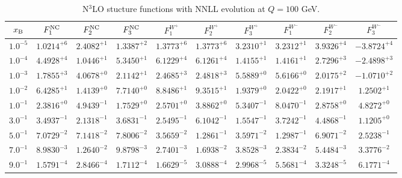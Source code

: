 \begin{table}[h]
\begin{adjustbox}{width=\textwidth}
\begin{tabular}{|c||c|c|c|c|c|c|c|c|c|}
\hline
$x_{\rm B}$ & $F_1^{\rm NC}$ & $F_2^{\rm NC}$ & $F_3^{\rm NC}$ & $F_1^{W^+}$ & $F_2^{W^+}$ & $F_3^{W^+}$ & $F_1^{W^-}$ & $F_2^{W^-}$ & $F_3^{W^-}$ \\
\hline
$ 1.0^{-5}$ & $ 1.0214^{+6}$ & $ 2.4082^{+1}$ & $ 1.3387^{+2}$ & $ 1.3773^{+6}$ & $ 1.3773^{+6}$ & $ 3.2310^{+1}$ & $ 3.2312^{+1}$ & $ 3.9326^{+4}$ & $-3.8724^{+4}$ \\
$ 1.0^{-4}$ & $ 4.4928^{+4}$ & $ 1.0446^{+1}$ & $ 5.3450^{+1}$ & $ 6.1229^{+4}$ & $ 6.1261^{+4}$ & $ 1.4155^{+1}$ & $ 1.4161^{+1}$ & $ 2.7296^{+3}$ & $-2.4898^{+3}$ \\
$ 1.0^{-3}$ & $ 1.7855^{+3}$ & $ 4.0678^{+0}$ & $ 2.1142^{+1}$ & $ 2.4685^{+3}$ & $ 2.4818^{+3}$ & $ 5.5889^{+0}$ & $ 5.6166^{+0}$ & $ 2.0175^{+2}$ & $-1.0710^{+2}$ \\
$ 1.0^{-2}$ & $ 6.4285^{+1}$ & $ 1.4139^{+0}$ & $ 7.7140^{+0}$ & $ 8.8486^{+1}$ & $ 9.3515^{+1}$ & $ 1.9379^{+0}$ & $ 2.0422^{+0}$ & $ 2.1917^{+1}$ & $ 1.2502^{+1}$ \\
$ 1.0^{-1}$ & $ 2.3816^{+0}$ & $ 4.9439^{-1}$ & $ 1.7529^{+0}$ & $ 2.5701^{+0}$ & $ 3.8862^{+0}$ & $ 5.3407^{-1}$ & $ 8.0470^{-1}$ & $ 2.8758^{+0}$ & $ 4.8272^{+0}$ \\
$ 3.0^{-1}$ & $ 3.4937^{-1}$ & $ 2.1318^{-1}$ & $ 3.6831^{-1}$ & $ 2.5495^{-1}$ & $ 6.1042^{-1}$ & $ 1.5547^{-1}$ & $ 3.7242^{-1}$ & $ 4.4868^{-1}$ & $ 1.1205^{+0}$ \\
$ 5.0^{-1}$ & $ 7.0729^{-2}$ & $ 7.1418^{-2}$ & $ 7.8006^{-2}$ & $ 3.5659^{-2}$ & $ 1.2861^{-1}$ & $ 3.5971^{-2}$ & $ 1.2987^{-1}$ & $ 6.9071^{-2}$ & $ 2.5238^{-1}$ \\
$ 7.0^{-1}$ & $ 8.9830^{-3}$ & $ 1.2640^{-2}$ & $ 9.8798^{-3}$ & $ 2.7401^{-3}$ & $ 1.6938^{-2}$ & $ 3.8528^{-3}$ & $ 2.3834^{-2}$ & $ 5.4484^{-3}$ & $ 3.3776^{-2}$ \\
$ 9.0^{-1}$ & $ 1.5791^{-4}$ & $ 2.8466^{-4}$ & $ 1.7112^{-4}$ & $ 1.6629^{-5}$ & $ 3.0888^{-4}$ & $ 2.9968^{-5}$ & $ 5.5681^{-4}$ & $ 3.3248^{-5}$ & $ 6.1771^{-4}$ \\
\hline
\end{tabular}
\end{adjustbox}\caption{N$^{3}$LO stucture functions with NNLL evolution at $Q = 100$ GeV.}
\label{tab:N3LO-Q100}
\end{table}


